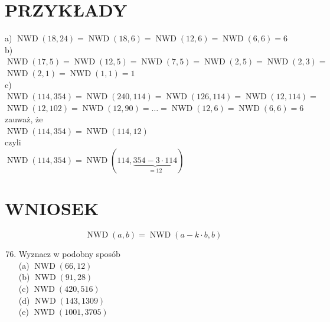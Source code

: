 \documentclass[10pt]{article}
\begin{document}
\section*{PRZYKŁADY}
a) \(\operatorname{NWD}(18,24)=\operatorname{NWD}(18,6)=\operatorname{NWD}(12,6)=\operatorname{NWD}(6,6)=6\)\\
b) \(\operatorname{NWD}(17,5)=\operatorname{NWD}(12,5)=\operatorname{NWD}(7,5)=\operatorname{NWD}(2,5)=\operatorname{NWD}(2,3)=\) \(\operatorname{NWD}(2,1)=\operatorname{NWD}(1,1)=1\)\\
c) \(\operatorname{NWD}(114,354)=\operatorname{NWD}(240,114)=\operatorname{NWD}(126,114)=\operatorname{NWD}(12,114)=\) \(\operatorname{NWD}(12,102)=\operatorname{NWD}(12,90)=\ldots=\operatorname{NWD}(12,6)=\operatorname{NWD}(6,6)=6\)\\
zauważ, że\\
\(\operatorname{NWD}(114,354)=\operatorname{NWD}(114,12)\)\\
czyli\\
\(\operatorname{NWD}(114,354)=\operatorname{NWD}(114, \underbrace{354-3 \cdot 114}_{=12})\)

\section*{WNIOSEK}
\[
\operatorname{NWD}(a, b)=\operatorname{NWD}(a-k \cdot b, b)
\]

\begin{enumerate}
  \setcounter{enumi}{75}
  \item Wyznacz w podobny sposób\\
(a) \(\operatorname{NWD}(66,12)\)\\
(b) \(\operatorname{NWD}(91,28)\)\\
(c) \(\operatorname{NWD}(420,516)\)\\
(d) \(\operatorname{NWD}(143,1309)\)\\
(e) \(\operatorname{NWD}(1001,3705)\)
\end{enumerate}
\end{document}
